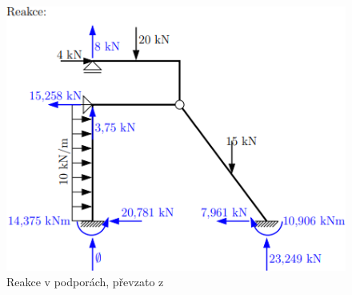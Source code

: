 \begin{figure}[H]
    \includegraphics{assets/figures/framesss/example_reactions.png}
    \caption[Reakce v podporách]{Reakce v podporách, převzato z \cite[Příklad 5.2]{sbirka_prikladu}}
    \label{fig:framesss_example_reactions}
\end{figure}

